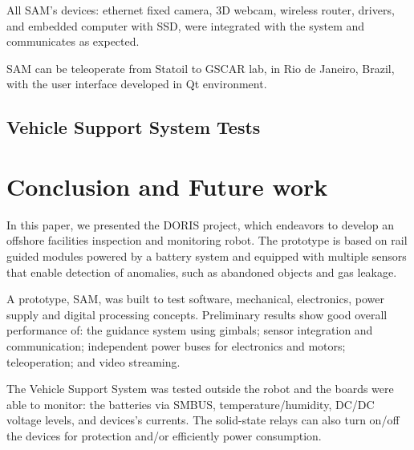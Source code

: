 \documentclass{ifacconf}
\begin{document}
All SAM's devices: ethernet fixed camera, 3D webcam, wireless router, drivers,
and embedded computer with SSD, were integrated with the system and communicates
as expected. 

SAM can be teleoperate from Statoil to GSCAR lab, in Rio de Janeiro, Brazil,
with the user interface developed in Qt environment.

\subsection{Vehicle Support System Tests}
\section{Conclusion and Future work}\label{sec:conclwusions}

In this paper, we presented the DORIS project, which endeavors to develop an
offshore facilities inspection and monitoring robot. The prototype is based on
rail guided modules powered by a battery system and equipped with multiple
sensors that enable detection of anomalies, such as abandoned objects and gas
leakage. 

A prototype, SAM, was built to test software, mechanical,
electronics, power supply and digital processing concepts.
Preliminary results show good overall performance of: the guidance system using
gimbals; sensor integration and communication; independent power buses for
electronics and motors; teleoperation; and video streaming.

The Vehicle Support System was tested outside the robot and the boards were able
to monitor: the batteries via SMBUS, temperature/humidity, DC/DC voltage levels,
and devices's currents. The solid-state relays can also turn on/off the devices
for protection and/or efficiently power consumption.
\end{document}
